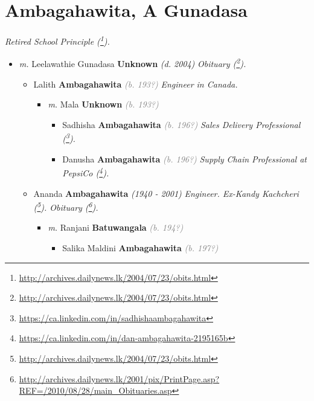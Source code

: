 \documentclass[10pt, openany]{book}
\begin{document}
\chapter{Ambagahawita, A Gunadasa}
\label{00000078}
\textcolor{slmaroon}{\textit{Retired School Principle (\footnote{\url{http://archives.dailynews.lk/2004/07/23/obits.html}}).}}
\begin{itemize}
\item{\textit{m.} Leelawathie Gunadasa \textbf{Unknown} \textcolor{slorange}{\textit{(d. 2004)}} \textcolor{slmaroon}{\textit{Obituary (\footnote{\url{http://archives.dailynews.lk/2004/07/23/obits.html}}).}}   \label{couple:00000078:00000894} \begin{itemize}
\item{Lalith \textbf{Ambagahawita} \textcolor{gray}{\textit{(b. 193?)}} \textcolor{slmaroon}{\textit{Engineer in Canada.}}
\begin{itemize}
\item{\textit{m.} Mala \textbf{Unknown} \textcolor{gray}{\textit{(b. 193?)}}   \label{couple:00000081:00000890} \begin{itemize}
\item{Sadhisha \textbf{Ambagahawita} \textcolor{gray}{\textit{(b. 196?)}} \textcolor{slmaroon}{\textit{Sales Delivery Professional (\footnote{\url{https://ca.linkedin.com/in/sadhishaambagahawita}}).}}
 }
\item{Danusha \textbf{Ambagahawita} \textcolor{gray}{\textit{(b. 196?)}} \textcolor{slmaroon}{\textit{Supply Chain Professional at PepsiCo (\footnote{\url{https://ca.linkedin.com/in/dan-ambagahawita-2195165b}}).}}
 }
\end{itemize}}
\end{itemize}
 }
\item{Ananda \textbf{Ambagahawita} \textcolor{slorange}{\textit{(1940 - 2001)}} \textcolor{slmaroon}{\textit{Engineer. Ex-Kandy Kachcheri (\footnote{\url{http://archives.dailynews.lk/2004/07/23/obits.html}}).
Obituary (\footnote{\url{http://archives.dailynews.lk/2001/pix/PrintPage.asp?REF=/2010/08/28/main_Obituaries.asp}}).}}
\begin{itemize}
\item{\textit{m.} Ranjani \textbf{Batuwangala} \textcolor{gray}{\textit{(b. 194?)}}   \label{couple:00000069:00000121} \begin{itemize}
\item{Salika Maldini \textbf{Ambagahawita} \textcolor{gray}{\textit{(b. 197?)}}
}
\end{itemize}}
\end{itemize}}
\end{itemize}}
\end{itemize}
\end{document}
